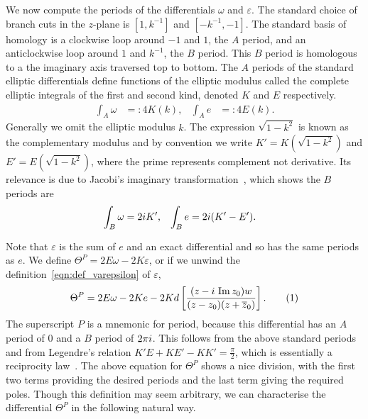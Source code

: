 \documentclass{article}
\begin{document}
We now compute the periods of the differentials $\omega$ and $\varepsilon$. 
The standard choice of branch cuts in the $z$-plane is $[1,k^{-1}]$ and $[-k^{-1},-1]$. The standard basis of homology is a clockwise loop around $-1$ and $1$, the $A$ period, and an anticlockwise loop around $1$ and $k^{-1}$, the $B$ period. This $B$ period is homologous to a the imaginary axis traversed top to bottom. 
The $A$ periods of the standard elliptic differentials define functions of the elliptic modulus called the complete elliptic integrals of the first and second kind, denoted $K$ and $E$ respectively.
\begin{align*}
    \int_{A} \omega &=: 4K(k), &
    \int_{A} e &=: 4E(k).
\end{align*}
Generally we omit the elliptic modulus $k$.
The expression $\sqrt{1-k^2}$ is known as the complementary modulus and by convention we write $K' = K(\sqrt{1-k^2})$ and $E' = E(\sqrt{1-k^2})$, where the prime represents complement not derivative. 
Its relevance is due to Jacobi's imaginary transformation~\cite[p. 34]{Jacobi1829}, which shows the $B$ periods are
\begin{align*}
\int_{B} \omega &= 2i K', &
\int_{B} e &= 2i(K'-E').
\end{align*}

Note that $\varepsilon$ is the sum of $e$ and an exact differential and so has the same periods as $e$. We define $\Theta^P = 2E\omega - 2K\varepsilon$, or if we unwind the definition~\eqref{eqn:def_varepsilon} of $\varepsilon$,
\[
\Theta^P = 2E \omega - 2Ke - 2K d\left[ \frac{(z-\iu\,\Imag z_0)w}{(z-z_0)(z + \bar{z}_0)} \right].
\labelthis{eqn:thetaP}
\]
The superscript $P$ is a mnemonic for period, because this differential has an $A$ period of $0$ and a $B$ period of $2\pi i$. This follows from the above standard periods and from Legendre's relation $K'E + KE' - KK' = \frac{\pi}{2}$,
which is essentially a reciprocity law~\cite{Griffiths1994}.
The above equation for $\Theta^P$ shows a nice division, with the first two terms providing the desired periods and the last term giving the required poles. Though this definition may seem arbitrary, we can characterise the differential $\Theta^P$ in the following natural way.
\end{document}

